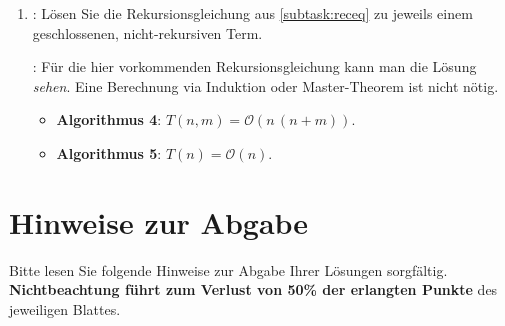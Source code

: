 \documentclass[german]{acAssignment}
\begin{document}
\begin{enumerate}
    \item
        :
        Lösen Sie die Rekursionsgleichung aus \cref{subtask:receq} zu jeweils einem geschlossenen, nicht-rekursiven Term.
        
        \acNote:
        Für die hier vorkommenden Rekursionsgleichung kann man die Lösung \emph{sehen}.
        Eine Berechnung via Induktion oder Master-Theorem ist nicht nötig.
        
        \begin{acSolution}
            \begin{itemize}
                \item \textbf{Algorithmus 4}: $T(n, m) = \mathcal{O}(n\,(n + m))$.
                \item \textbf{Algorithmus 5}: $T(n) = \mathcal{O}(n)$.
            \end{itemize}
        \end{acSolution}
\end{enumerate}


\section{Hinweise zur Abgabe}
\label{sec:submission-notes}

Bitte lesen Sie folgende Hinweise zur Abgabe Ihrer Lösungen sorgfältig.
\textbf{Nichtbeachtung führt zum Verlust von 50\% der erlangten Punkte} des jeweiligen Blattes.
\end{document}
